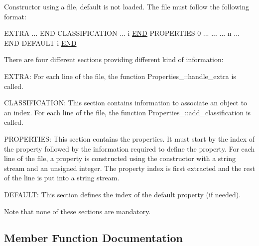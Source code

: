 Constructor using a file, default is not loaded. The file must follow the following format\+: 
\begin{DoxyCode}
EXTRA
...
END
CLASSIFICATION
... i
\hyperlink{namespaceESBTL_1_1PDB_a6f11e88f706f51afbe97230641a469b7a9e600568c8b2d3043ae18011d3668406}{END}
PROPERTIES
 0  ...
... ...
 n  ...
END
DEFAULT
i
\hyperlink{namespaceESBTL_1_1PDB_a6f11e88f706f51afbe97230641a469b7a9e600568c8b2d3043ae18011d3668406}{END}
\end{DoxyCode}


There are four different sections providing different kind of information\+:
\begin{DoxyItemize}
\item E\+X\+T\+RA\+: For each line of the file, the function Properties\+\_\+\+::handle\+\_\+extra is called.
\item C\+L\+A\+S\+S\+I\+F\+I\+C\+A\+T\+I\+ON\+: This section contains information to associate an object to an index. For each line of the file, the function Properties\+\_\+\+::add\+\_\+classification is called.
\item P\+R\+O\+P\+E\+R\+T\+I\+ES\+: This section contains the properties. It must start by the index of the property followed by the information required to define the property. For each line of the file, a property is constructed using the constructor with a string stream and an unsigned integer. The property index is first extracted and the rest of the line is put into a string stream.
\item D\+E\+F\+A\+U\+LT\+: This section defines the index of the default property (if needed).
\end{DoxyItemize}

Note that none of these sections are mandatory. 

\subsection{Member Function Documentation}
\mbox{\label{structESBTL_1_1Generic__classifier_a2801becec2140ba68038dc7adbd513b2}} 
